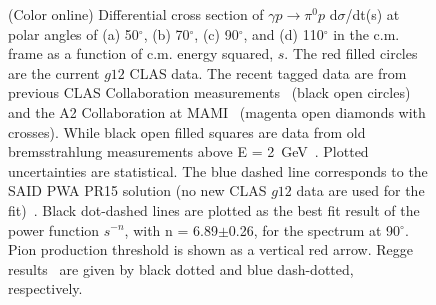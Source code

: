 \documentclass[aps,prc,twocolumn,floatfix,showpacs,preprintnumbers,amsmath,amssymb,superscriptaddress,linenumbers]{revtex4-1}
\begin{document}
\begin{figure}[htb!]
        \caption {(Color online) Differential cross section of 
	$\gamma p\rightarrow\pi^0p$ d$\sigma$/dt(s) at polar angles 
	of (a) 50$^\circ$, (b) 70$^\circ$, 
	(c) 90$^\circ$, and (d) 
	110$^\circ$ in the c.m. frame as a function of c.m. energy 
	squared, $s$. The red filled circles are the current $g12$ 
	CLAS data. The recent tagged data are from previous 
	CLAS Collaboration 
	measurements~\protect\cite{Dugger:2007bt} (black open 
	circles) and the A2 Collaboration at 
	MAMI~\protect\cite{Adlarson:2015byy} 
	(magenta open diamonds with crosses). While black open filled 
	squares are data from old bremsstrahlung measurements above 
	E = 2~GeV~\protect\cite{brem}. Plotted uncertainties are 
	statistical.  
	The blue dashed line corresponds to the SAID PWA 
	PR15 solution (no new CLAS $g12$ data are used 
	for the fit)~\protect\cite{Adlarson:2015byy}.  Black dot-dashed 
	lines are plotted as the best fit result of the power function $s^{-n}$, with n = 6.89$\pm$0.26, for the spectrum at 
	90$^\circ$. Pion production threshold is shown as a vertical 
	red arrow. Regge results~\protect\cite{Goldstein:1973xn,
	Laget:2005be} are given by black dotted and blue dash-dotted, 
	respectively.} \label{fig:scaling}
\end{figure}
\end{document}
